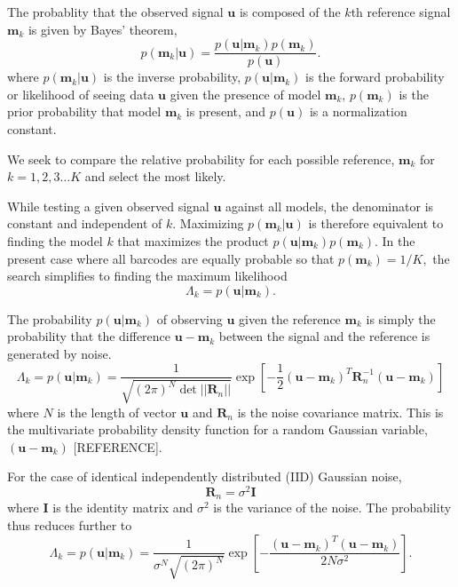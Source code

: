 The probablity that the observed signal $\mathbf{u}$ is composed of the $k$th reference signal $\mathbf{m}_k$ is given by Bayes' theorem,
\begin{equation}\label{eq:Bayes}
p(\mathbf{m}_k|\mathbf{u}) = \frac{p(\mathbf{u}|\mathbf{m}_k)p(\mathbf{m}_k)} {p(\mathbf{u})}.
\end{equation}
where $p(\mathbf{m}_k|\mathbf{u})$ is the inverse probability, $p(\mathbf{u}|\mathbf{m}_k)$ is the forward probability or likelihood of seeing data $\mathbf{u}$ given the presence of model $\mathbf{m}_k$, $p(\mathbf{m}_k)$ is the prior probability that model $\mathbf{m}_k$ is present, and $p(\mathbf{u})$ is a normalization constant.

We seek to compare the relative  probability for each possible reference, $\mathbf{m}_k$ for $k=1,2,3 \ldots K$ and select the most likely.  

While testing a given observed signal $\mathbf{u}$ against all models, the denominator is constant and independent of $k$. Maximizing $p(\mathbf{m}_k|\mathbf{u})$ is therefore equivalent to finding the model $k$ that maximizes the product  $p(\mathbf{u}|\mathbf{m}_k)p(\mathbf{m}_k)$.
In the present case where all barcodes are equally probable so that
$p(\mathbf{m}_k)=1/K,$ 
the search simplifies to finding the maximum likelihood 
\begin{equation}
\Lambda_k = p(\mathbf{u}|\mathbf{m}_k).
\end{equation}



The probability $p(\mathbf{u}|\mathbf{m}_k)$ of observing $\mathbf{u}$ given the reference $\mathbf{m}_k$  is simply the probability that the difference $\mathbf{u}-\mathbf{m}_k$ between the signal and the reference is generated by noise.
\begin{equation}\label{eq:Main}
\Lambda_k = p(\mathbf{u}|\mathbf{m}_k) = \frac{1}{  \sqrt{ (2\pi)^N \det || \mathbf{R}_n||} } \exp\left[ -\frac{1}{2}  (\mathbf{u}-\mathbf{m}_k)^T \mathbf{R}_n^{-1} (\mathbf{u}-\mathbf{m}_k) \right]
\end{equation}
where $N$ is the length of vector $\mathbf{u}$ and $\mathbf{R}_n$ is the noise covariance matrix. This is the multivariate probability density function for a random Gaussian variable,  $(\mathbf{u}-\mathbf{m}_k)$ [REFERENCE].

For the case of identical independently distributed (IID) Gaussian noise, 
\begin{equation}
\mathbf{R}_n=\sigma^2 \mathbf{I}
\end{equation}
where $\mathbf{I}$ is the identity matrix and $\sigma^2$ is the variance of the noise. The probability thus reduces further to
\begin{equation}\label{eq:iidEnergy}
\Lambda_k = p(\mathbf{u}|\mathbf{m}_k) = \frac{1}{  \sigma^N \sqrt{ (2\pi)^N}   } \exp\left[ -\frac{(\mathbf{u}-\mathbf{m}_k)^T(\mathbf{u}-\mathbf{m}_k)} {2 N \sigma^2 } \right].
\end{equation}

